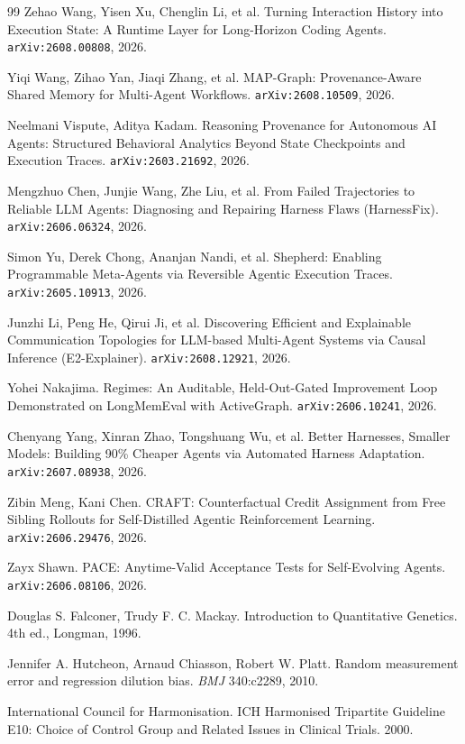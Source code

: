 \begin{thebibliography}{99}
 Zehao Wang, Yisen Xu, Chenglin Li, et al. Turning
  Interaction History into Execution State: A Runtime Layer for
  Long-Horizon Coding Agents. \texttt{arXiv:2608.00808}, 2026.

 Yiqi Wang, Zihao Yan, Jiaqi Zhang, et al. MAP-Graph:
  Provenance-Aware Shared Memory for Multi-Agent Workflows.
  \texttt{arXiv:2608.10509}, 2026.

 Neelmani Vispute, Aditya Kadam. Reasoning Provenance for
  Autonomous AI Agents: Structured Behavioral Analytics Beyond State
  Checkpoints and Execution Traces. \texttt{arXiv:2603.21692}, 2026.

 Mengzhuo Chen, Junjie Wang, Zhe Liu, et al. From
  Failed Trajectories to Reliable LLM Agents: Diagnosing and Repairing
  Harness Flaws (HarnessFix). \texttt{arXiv:2606.06324}, 2026.

 Simon Yu, Derek Chong, Ananjan Nandi, et al. Shepherd:
  Enabling Programmable Meta-Agents via Reversible Agentic Execution
  Traces. \texttt{arXiv:2605.10913}, 2026.

 Junzhi Li, Peng He, Qirui Ji, et al. Discovering
  Efficient and Explainable Communication Topologies for LLM-based
  Multi-Agent Systems via Causal Inference (E2-Explainer).
  \texttt{arXiv:2608.12921}, 2026.

 Yohei Nakajima. Regimes: An Auditable, Held-Out-Gated
  Improvement Loop Demonstrated on LongMemEval with ActiveGraph.
  \texttt{arXiv:2606.10241}, 2026.

 Chenyang Yang, Xinran Zhao, Tongshuang Wu, et
  al. Better Harnesses, Smaller Models: Building 90\% Cheaper Agents via
  Automated Harness Adaptation. \texttt{arXiv:2607.08938}, 2026.

 Zibin Meng, Kani Chen. CRAFT: Counterfactual Credit
  Assignment from Free Sibling Rollouts for Self-Distilled Agentic
  Reinforcement Learning. \texttt{arXiv:2606.29476}, 2026.

 Zayx Shawn. PACE: Anytime-Valid Acceptance Tests for
  Self-Evolving Agents. \texttt{arXiv:2606.08106}, 2026.

 Douglas S. Falconer, Trudy F. C. Mackay.
  Introduction to Quantitative Genetics. 4th ed., Longman, 1996.

 Jennifer A. Hutcheon, Arnaud Chiasson, Robert
  W. Platt. Random measurement error and regression dilution bias.
  \emph{BMJ} 340:c2289, 2010.

 International Council for Harmonisation. ICH
  Harmonised Tripartite Guideline E10: Choice of Control Group and
  Related Issues in Clinical Trials. 2000.

\end{thebibliography}
